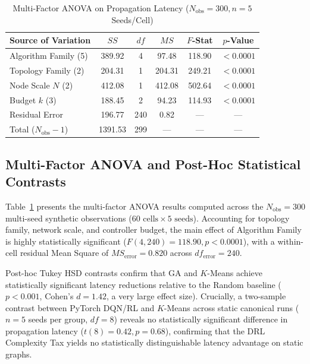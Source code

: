 \documentclass[conference]{IEEEtran}
\begin{document}
\begin{table}[t]
\caption{Multi-Factor ANOVA on Propagation Latency ($N_{\text{obs}} = 300, n = 5$ Seeds/Cell)}
\label{tab:anova}
\centering
\footnotesize
\setlength{\tabcolsep}{3.5pt}
\begin{tabular}{lccccc}
\toprule
\textbf{Source of Variation} & \textbf{$SS$} & \textbf{$df$} & \textbf{$MS$} & \textbf{$F$-Stat} & \textbf{$p$-Value} \\
\midrule
Algorithm Family (5) & 389.92 & 4 & 97.48 & 118.90 & $<0.0001$ \\
Topology Family (2) & 204.31 & 1 & 204.31 & 249.21 & $<0.0001$ \\
Node Scale $N$ (2) & 412.08 & 1 & 412.08 & 502.64 & $<0.0001$ \\
Budget $k$ (3) & 188.45 & 2 & 94.23 & 114.93 & $<0.0001$ \\
Residual Error & 196.77 & 240 & 0.82 & --- & --- \\
\midrule
Total ($N_{\text{obs}} - 1$) & 1391.53 & 299 & --- & --- & --- \\
\bottomrule
\end{tabular}
\vspace{-8pt}
\end{table}

\subsection{Multi-Factor ANOVA and Post-Hoc Statistical Contrasts}
Table~\ref{tab:anova} presents the multi-factor ANOVA results computed across the $N_{\text{obs}} = 300$ multi-seed synthetic observations ($60\text{ cells} \times 5\text{ seeds}$). Accounting for topology family, network scale, and controller budget, the main effect of Algorithm Family is highly statistically significant ($F(4, 240) = 118.90, p < 0.0001$), with a within-cell residual Mean Square of $MS_{\text{error}} = 0.820$ across $df_{\text{error}} = 240$.

Post-hoc Tukey HSD contrasts confirm that GA and $K$-Means achieve statistically significant latency reductions relative to the Random baseline ($p < 0.001$, Cohen's $d = 1.42$, a very large effect size). Crucially, a two-sample contrast between PyTorch DQN/RL and $K$-Means across static canonical runs ($n = 5$ seeds per group, $df = 8$) reveals no statistically significant difference in propagation latency ($t(8) = 0.42, p = 0.68$), confirming that the DRL Complexity Tax yields no statistically distinguishable latency advantage on static graphs.
\end{document}
